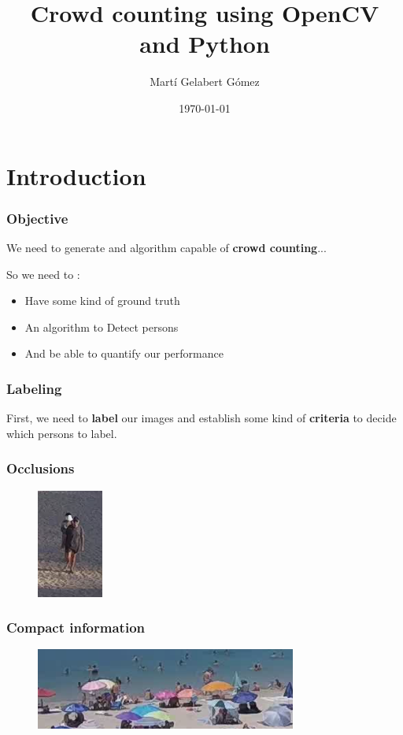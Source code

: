 \documentclass{beamer}
\title{Crowd counting using OpenCV and Python}
\author{Martí Gelabert Gómez}
\institute{University of the Balearic Islands}
\date{\today}
\begin{document}
\frame{\titlepage}

\section*{Introduction}
\begin{frame}

    \frametitle{Objective}
    We need to generate and algorithm capable of \textbf{crowd counting}...\medskip\pause
    
    So we need  to :
    \begin{itemize}
        
        \item<2-> Have some kind of ground truth
        \item<3-> An algorithm to Detect persons
        \item<4-> And be able to quantify our performance
    \end{itemize}

\end{frame}


\begin{frame}
    \frametitle{Labeling}
    First, we need to \textbf{label} our images and establish some kind of \textbf{criteria} to decide which persons to label. 
\end{frame}

\begin{frame}
    \frametitle{Occlusions}
\begin{figure}
    \centering
    \includegraphics{lab/oclusion.png}
\end{figure}
\end{frame}

\begin{frame}
    \frametitle{Compact information}
\begin{figure}
    \centering
    \includegraphics{lab/shore.png}
\end{figure}
\end{frame}
\end{document}
